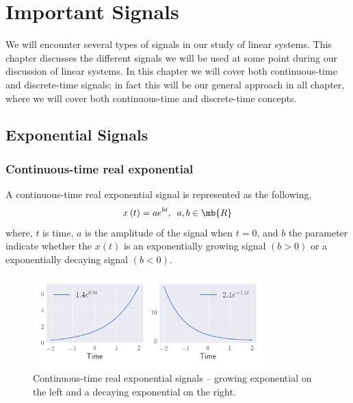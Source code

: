 
\chapter{Important Signals}


We will encounter several types of signals in our study of linear systems. This chapter discusses the different signals we will be used at some point during our discussion of linear systems. In this chapter we will cover both continuous-time and discrete-time signals; in fact this will be our general approach in all chapter, where we will cover both continuous-time and discrete-time concepts. 

\section{Exponential Signals}
\subsection{Continuous-time real exponential}
A continuous-time real exponential signal is represented as the following,
\[ x\left(t\right) = ae^{bt}, \,\,\, a, b \in \mb{R} \]
\noindent where, $t$ is time, $a$ is the amplitude of the signal when $t = 0$, and $b$ the parameter indicate whether the $x\left(t\right)$ is an exponentially growing signal $\left(b > 0\right)$ or a exponentially decaying signal $\left(b < 0\right)$.

\begin{figure}[h!]
    \centering
    \includegraphics[width=0.8\textwidth]{figs/ch2-expsig.png}
    \caption{Continuous-time real exponential signals -- growing exponential on the left and a decaying exponential on the right.}
    \label{fig:ch2-expsig}
\end{figure}

